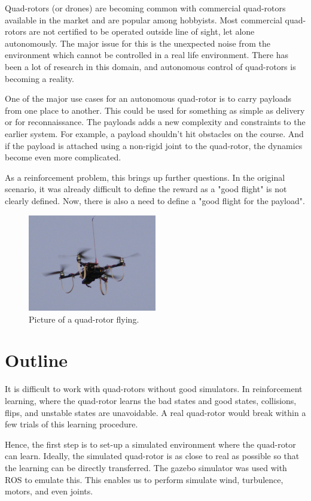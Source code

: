 \documentclass[hidelinks,BTech]{iitmdiss}
\begin{document}
Quad-rotors (or drones) are becoming common with commercial quad-rotors available in the market and are popular among hobbyists. Most commercial quad-rotors are not certified to be operated outside line of sight, let alone autonomously. The major issue for this is the unexpected noise from the environment which cannot be controlled in a real life environment. There has been a lot of research in this domain, and autonomous control of quad-rotors is becoming a reality.

One of the major use cases for an autonomous quad-rotor is to carry payloads from one place to another. This could be used for something as simple as delivery or for reconnaissance. The payloads adds a new complexity and constraints to the earlier system. For example, a payload shouldn't hit obstacles on the course. And if the payload is attached using a non-rigid joint to the quad-rotor, the dynamics become even more complicated.

As a reinforcement problem, this brings up further questions. In the original scenario, it was already difficult to define the reward as a "good flight" is not clearly defined. Now, there is also a need to define a "good flight for the payload".

\begin{figure}[H]
  \centering
    \includegraphics[width=0.5\textwidth]{quadrotor.jpg}
    \caption{Picture of a quad-rotor flying.}
\end{figure}

\section{Outline}

It is difficult to work with quad-rotors without good simulators. In reinforcement learning, where the quad-rotor learns the bad states and good states, collisions, flips, and unstable states are unavoidable. A real quad-rotor would break within a few trials of this learning procedure.

Hence, the first step is to set-up a simulated environment where the quad-rotor can learn. Ideally, the simulated quad-rotor is as close to real as possible so that the learning can be directly transferred. The gazebo simulator was used with ROS to emulate this. This enables us to perform simulate wind, turbulence, motors, and even joints.
\end{document}
